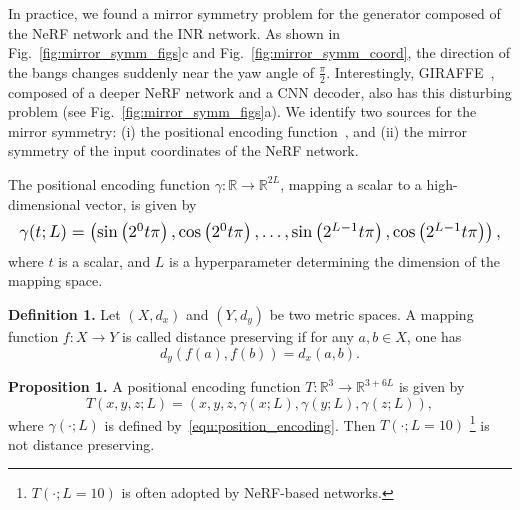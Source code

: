 \documentclass[10pt,twocolumn,letterpaper]{article}
\newcommand{\R}{\mathbb{R}}
\begin{document}
In practice, we found a mirror symmetry problem for the generator composed of the NeRF network and the INR network. As shown in Fig.~\ref{fig:mirror_symm_figs}c and Fig.~\ref{fig:mirror_symm_coord}, the direction of the bangs changes suddenly near the yaw angle of $\frac{\pi}{2}$. Interestingly, GIRAFFE~\cite{niemeyer2021GIRAFFE}, composed of a deeper NeRF network and a CNN decoder, also has this disturbing problem (see Fig.~\ref{fig:mirror_symm_figs}a). We identify two sources for the mirror symmetry: (i) the positional encoding function~\cite{mildenhall2020NeRF}, and (ii) the mirror symmetry of the input coordinates of the NeRF network.

The positional encoding function $\gamma: \R \rightarrow \R^{2L}$, mapping a scalar to a high-dimensional vector, is given by
\begin{equation}
  \resizebox{\hsize}{!}{$
      \gamma(t; L)=
      \left(\sin \left(2^{0} t \pi\right), \cos \left(2^{0} t \pi\right), \ldots, \sin \left(2^{L-1} t \pi\right), \cos \left(2^{L-1} t \pi\right)\right),
    $}
  \label{equ:position_encoding}
\end{equation}
where $t$ is a scalar, and $L$ is a hyperparameter determining the dimension of the mapping space.


\textbf{Definition 1.}
Let $(X, d_x)$ and $(Y, d_y)$ be two metric spaces. A mapping function $f:X \rightarrow Y$ is called distance preserving if for any $a, b \in X$, one has
\begin{equation}
  d_{y}(f(a), f(b))=d_{x}(a, b).
  \label{equ:distance_preserving}
\end{equation}


\textbf{Proposition 1.} A positional encoding function $T: \R^3 \rightarrow \R^{3+6L}$ is given by
\begin{equation}
  T(x, y, z; L)=(x, y, z, \gamma(x;L), \gamma(y;L), \gamma(z;L)),
  \label{equ:proposition}
\end{equation}
where $\gamma(\cdot; L)$ is defined by~\cref{equ:position_encoding}. Then $T(\cdot; L=10)$ \footnote{$T(\cdot; L=10)$ is often adopted by NeRF-based networks.} is not distance preserving.
\end{document}
